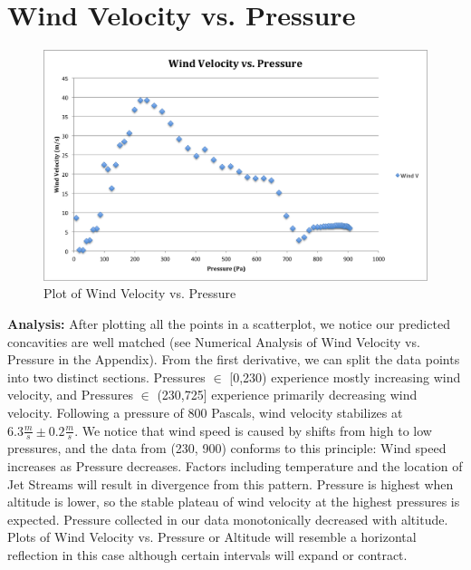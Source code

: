 \documentclass{article}
\begin{document}
\part{Wind Velocity vs. Pressure}


\begin{figure}[H]
\centering
\includegraphics[width=\textwidth]{IMG1CDATA.png}
\caption{Plot of Wind Velocity vs. Pressure}
\end{figure}

\begin{flushleft}
\textbf{Analysis:} After plotting all the points in a scatterplot, we notice our predicted concavities are well matched (see Numerical Analysis of Wind Velocity vs. Pressure in the Appendix).  From the first derivative, we can split the data points into two distinct sections.  Pressures $\in$ [0,230) experience mostly increasing wind velocity, and Pressures $\in$ (230,725] experience primarily decreasing wind velocity.  Following a pressure of 800 Pascals, wind velocity stabilizes at $6.3\frac{m}{s} \pm 0.2\frac{m}{s}$.  We notice that wind speed is caused by shifts from high to low pressures, and the data from (230, 900) conforms to this principle: Wind speed increases as Pressure decreases.  Factors including temperature and the location of Jet Streams will result in divergence from this pattern.  Pressure is highest when altitude is lower, so the stable plateau of wind velocity at the highest pressures is expected.  Pressure collected in our data monotonically decreased with altitude.  Plots of Wind Velocity vs. Pressure or Altitude will resemble a horizontal reflection in this case although certain intervals will expand or contract.
\end{flushleft}
\end{document}
